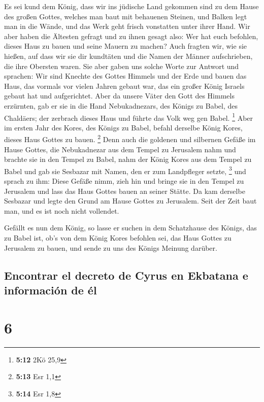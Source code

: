  Es sei kund dem König, dass wir ins jüdische Land
gekommen sind zu dem Hause des großen Gottes, welches man baut mit
behauenen Steinen, und Balken legt man in die Wände, und das Werk geht
frisch vonstatten unter ihrer Hand.  Wir aber haben die
Ältesten gefragt und zu ihnen gesagt also: Wer hat euch befohlen, dieses
Haus zu bauen und seine Mauern zu machen?  Auch fragten
wir, wie sie hießen, auf dass wir sie dir kundtäten und die Namen der
Männer aufschrieben, die ihre Obersten waren.  Sie aber
gaben uns solche Worte zur Antwort und sprachen: Wir sind Knechte des
Gottes Himmels und der Erde und bauen das Haus, das vormals vor vielen
Jahren gebaut war, das ein großer König Israels gebaut hat und
aufgerichtet.  Aber da unsere Väter den Gott des Himmels
erzürnten, gab er sie in die Hand Nebukadnezars, des Königs zu Babel,
des Chaldäers; der zerbrach dieses Haus und führte das Volk weg gen
Babel. \footnote{\textbf{5:12} 2Kö 25,9}  Aber im ersten
Jahr des Kores, des Königs zu Babel, befahl derselbe König Kores, dieses
Haus Gottes zu bauen. \footnote{\textbf{5:13} Esr 1,1} 
Denn auch die goldenen und silbernen Gefäße im Hause Gottes, die
Nebukadnezar aus dem Tempel zu Jerusalem nahm und brachte sie in den
Tempel zu Babel, nahm der König Kores aus dem Tempel zu Babel und gab
sie Sesbazar mit Namen, den er zum Landpfleger setzte, \footnote{\textbf{5:14}
  Esr 1,8}  und sprach zu ihm: Diese Gefäße nimm, zieh
hin und bringe sie in den Tempel zu Jerusalem und lass das Haus Gottes
bauen an seiner Stätte.  Da kam derselbe Sesbazar und
legte den Grund am Hause Gottes zu Jerusalem. Seit der Zeit baut man,
und es ist noch nicht vollendet.

 Gefällt es nun dem König, so lasse er suchen in dem
Schatzhause des Königs, das zu Babel ist, ob's von dem König Kores
befohlen sei, das Haus Gottes zu Jerusalem zu bauen, und sende zu uns
des Königs Meinung darüber.

\hypertarget{encontrar-el-decreto-de-cyrus-en-ekbatana-e-informaciuxf3n-de-uxe9l}{%
\subsection{Encontrar el decreto de Cyrus en Ekbatana e información de
él}\label{encontrar-el-decreto-de-cyrus-en-ekbatana-e-informaciuxf3n-de-uxe9l}}

\hypertarget{section-5}{%
\section{6}\label{section-5}}

